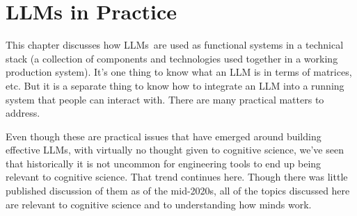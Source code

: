 \chapter{LLMs in Practice}\label{ch_llms_practice}






This chapter discusses how LLMs are used as functional systems in a technical stack (a collection of components and
technologies used together in a working production system).  It's one thing to
know what an LLM is in terms of matrices, etc.  But it is a separate thing to
know how to integrate an LLM into a running system that people can interact
with.  There are many practical matters to address.

Even though these are practical issues that have emerged around building
effective LLMs, with virtually no thought given to cognitive science, we've
seen that historically it is not uncommon for engineering tools to end up being
relevant to cognitive science. That trend continues here. Though there was
little published discussion of them as of the mid-2020s, all of the topics discussed here are relevant to
cognitive science and to understanding how minds work. 

